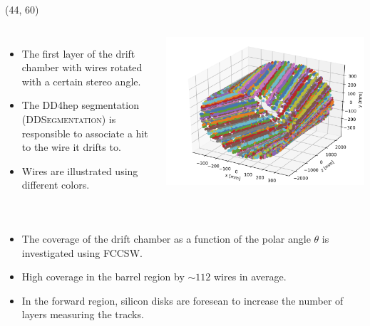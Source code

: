 \documentclass[final,xcolor={dvipsnames,svgnames,x11names,table}]{beamer}
\begin{document}
\begin{frame}
\begin{textblock}{43}
\begin{tcolorbox}[title=The drift chamber]
\begin{columns}
    \end{columns}

  \vspace{0.5cm}

  \end{tcolorbox}
\end{textblock}


\begin{textblock}{39.5}(44, 60)
  \begin{tcolorbox}[title=The simulation of the drift chamber with FCCSW]

    \begin{columns}
      \begin{itemize}
        \item The first layer of the drift chamber with wires rotated with a certain stereo angle.
        \item The DD4hep segmentation (\textsc{DDSegmentation}) is responsible to associate a hit to the wire it drifts to.
        \item Wires are illustrated using different colors.
      \end{itemize}

        \centering
        \includegraphics[width=\textwidth]{Figures/allHits}

    \end{columns}


    \begin{columns}
      \begin{itemize}
        \item The coverage of the drift chamber as a function of the polar angle $\theta$ is investigated using FCCSW.
        \item High coverage in the barrel region by $\sim 112$ wires in average.
        \item In the forward region, silicon disks are foresean to increase the number of layers measuring the tracks.
      \end{itemize}


\end{columns}
\end{tcolorbox}
\end{textblock}
\end{frame}
\end{document}
